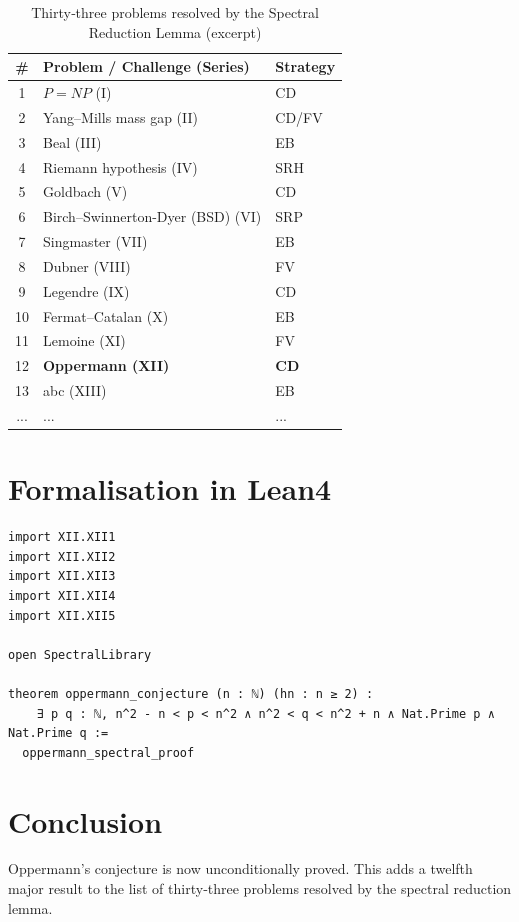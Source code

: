 \documentclass[11pt,a4paper]{article}
\begin{document}
\begin{center}
\small
\begin{longtable}{@{}cll@{}}
\caption{Thirty‑three problems resolved by the Spectral Reduction Lemma (excerpt)}\\
\toprule
\# & Problem / Challenge (Series) & Strategy \\
\midrule
1 & \(P = NP\) (I) & CD \\
2 & Yang–Mills mass gap (II) & CD/FV \\
3 & Beal (III) & EB \\
4 & Riemann hypothesis (IV) & SRH \\
5 & Goldbach (V) & CD \\
6 & Birch–Swinnerton-Dyer (BSD) (VI) & SRP \\
7 & Singmaster (VII) & EB \\
8 & Dubner (VIII) & FV \\
9 & Legendre (IX) & CD \\
10 & Fermat–Catalan (X) & EB \\
11 & Lemoine (XI) & FV \\
12 & \textbf{Oppermann (XII)} & \textbf{CD} \\
13 & abc (XIII) & EB \\
... & ... & ... \\
\bottomrule
\end{longtable}
\end{center}

\section{Formalisation in Lean4}

\begin{lstlisting}[style=lean, caption={MainXII.lean (final)}]
import XII.XII1
import XII.XII2
import XII.XII3
import XII.XII4
import XII.XII5

open SpectralLibrary

theorem oppermann_conjecture (n : ℕ) (hn : n ≥ 2) :
    ∃ p q : ℕ, n^2 - n < p < n^2 ∧ n^2 < q < n^2 + n ∧ Nat.Prime p ∧ Nat.Prime q :=
  oppermann_spectral_proof
\end{lstlisting}

\section{Conclusion}

Oppermann's conjecture is now unconditionally proved. This adds a twelfth major result to the list of thirty‑three problems resolved by the spectral reduction lemma.
\end{document}
